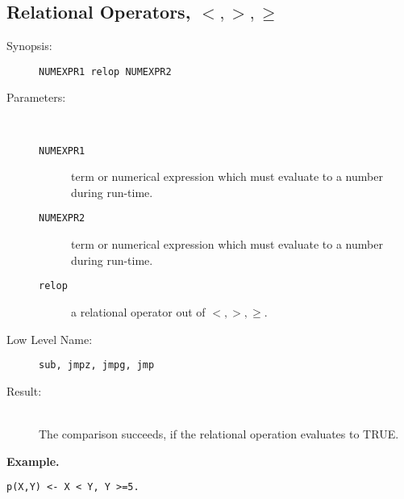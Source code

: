 %
%
%
\subsection{Relational Operators, $<,>,\geq$}

\begin{description}
\item[Synopsis:]
	{\tt NUMEXPR1 relop NUMEXPR2}
\item[Parameters:]\ \\[-0.5cm]
	\begin{description}
	\item[{\tt NUMEXPR1}]
term or numerical expression which must evaluate to a number during
run-time.
	\item[{\tt NUMEXPR2}]
term or numerical expression which must evaluate to a number during
run-time.
	\item[{\tt relop}]
a relational operator out of $<,>,\geq$.
	\end{description}
\item[Low Level Name:]
	{\tt sub, jmpz, jmpg, jmp}
\item[Result:]\ \\
The comparison succeeds, if the relational operation evaluates to TRUE.
\end{description}

\vspace*{0.5cm}
\noindent
{\bf Example.}
\begin{verbatim}
p(X,Y) <- X < Y, Y >=5.
\end{verbatim}


